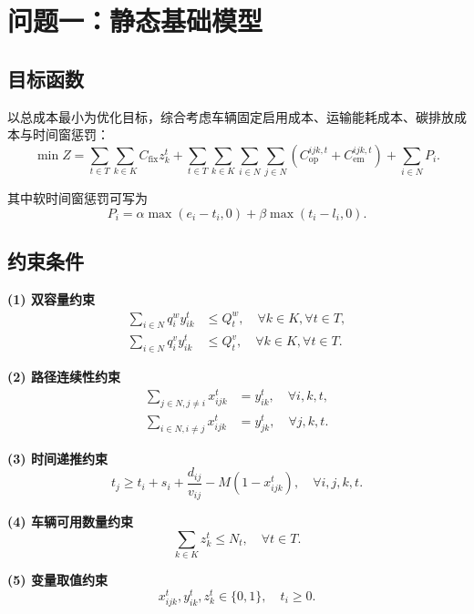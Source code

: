 \section{问题一：静态基础模型}

\subsection{目标函数}
以总成本最小为优化目标，综合考虑车辆固定启用成本、运输能耗成本、碳排放成本与时间窗惩罚：
\begin{equation}
\min Z = \sum_{t\in T}\sum_{k\in K} C_{\text{fix}} z_k^t
+ \sum_{t\in T}\sum_{k\in K}\sum_{i\in N}\sum_{j\in N}
\left(C_{\text{op}}^{ijk,t} + C_{\text{em}}^{ijk,t}\right)
+ \sum_{i\in N} P_i .
\end{equation}

其中软时间窗惩罚可写为
\begin{equation}
P_i = \alpha\max(e_i-t_i,0) + \beta\max(t_i-l_i,0).
\end{equation}

\subsection{约束条件}
\textbf{(1) 双容量约束}
\begin{align}
\sum_{i\in N} q_i^w y_{ik}^t &\le Q_t^w,\quad \forall k\in K,\forall t\in T,\\
\sum_{i\in N} q_i^v y_{ik}^t &\le Q_t^v,\quad \forall k\in K,\forall t\in T.
\end{align}

\textbf{(2) 路径连续性约束}
\begin{align}
\sum_{j\in N, j\neq i} x_{ijk}^t &= y_{ik}^t, \quad \forall i,k,t,\\
\sum_{i\in N, i\neq j} x_{ijk}^t &= y_{jk}^t, \quad \forall j,k,t.
\end{align}

\textbf{(3) 时间递推约束}
\begin{equation}
t_j \ge t_i + s_i + \frac{d_{ij}}{v_{ij}} - M(1-x_{ijk}^t),\quad \forall i,j,k,t.
\end{equation}

\textbf{(4) 车辆可用数量约束}
\begin{equation}
\sum_{k\in K} z_k^t \le N_t,\quad \forall t\in T.
\end{equation}

\textbf{(5) 变量取值约束}
\begin{equation}
x_{ijk}^t,y_{ik}^t,z_k^t\in\{0,1\},\quad t_i\ge 0.
\end{equation}
